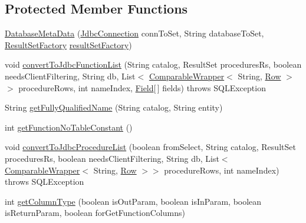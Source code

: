 \subsection*{Protected Member Functions}
\begin{DoxyCompactItemize}
\item 
\mbox{\hyperlink{classcom_1_1mysql_1_1cj_1_1jdbc_1_1_database_meta_data_a42c3cdfdc4a332f7c7bd740e2c069071}{Database\+Meta\+Data}} (\mbox{\hyperlink{interfacecom_1_1mysql_1_1cj_1_1jdbc_1_1_jdbc_connection}{Jdbc\+Connection}} conn\+To\+Set, String database\+To\+Set, \mbox{\hyperlink{classcom_1_1mysql_1_1cj_1_1jdbc_1_1result_1_1_result_set_factory}{Result\+Set\+Factory}} \mbox{\hyperlink{classcom_1_1mysql_1_1cj_1_1jdbc_1_1_database_meta_data_a339d870086c3e13ea14e9a6b3cf1894e}{result\+Set\+Factory}})
\item 
void \mbox{\hyperlink{classcom_1_1mysql_1_1cj_1_1jdbc_1_1_database_meta_data_a23ca9ddec13a2fa4cc61de50318d425a}{convert\+To\+Jdbc\+Function\+List}} (String catalog, Result\+Set procedures\+Rs, boolean needs\+Client\+Filtering, String db, List$<$ \mbox{\hyperlink{classcom_1_1mysql_1_1cj_1_1jdbc_1_1_database_meta_data_1_1_comparable_wrapper}{Comparable\+Wrapper}}$<$ String, \mbox{\hyperlink{interfacecom_1_1mysql_1_1cj_1_1result_1_1_row}{Row}} $>$$>$ procedure\+Rows, int name\+Index, \mbox{\hyperlink{classcom_1_1mysql_1_1cj_1_1result_1_1_field}{Field}}\mbox{[}$\,$\mbox{]} fields)  throws S\+Q\+L\+Exception 
\item 
String \mbox{\hyperlink{classcom_1_1mysql_1_1cj_1_1jdbc_1_1_database_meta_data_a88f763d1ddaabe666f7078dd8cd0d853}{get\+Fully\+Qualified\+Name}} (String catalog, String entity)
\item 
int \mbox{\hyperlink{classcom_1_1mysql_1_1cj_1_1jdbc_1_1_database_meta_data_a2f68f4cef1f669ef4e6b85ae8fc98ede}{get\+Function\+No\+Table\+Constant}} ()
\item 
void \mbox{\hyperlink{classcom_1_1mysql_1_1cj_1_1jdbc_1_1_database_meta_data_abe0f1cab8659812bac94f67040bddc4b}{convert\+To\+Jdbc\+Procedure\+List}} (boolean from\+Select, String catalog, Result\+Set procedures\+Rs, boolean needs\+Client\+Filtering, String db, List$<$ \mbox{\hyperlink{classcom_1_1mysql_1_1cj_1_1jdbc_1_1_database_meta_data_1_1_comparable_wrapper}{Comparable\+Wrapper}}$<$ String, \mbox{\hyperlink{interfacecom_1_1mysql_1_1cj_1_1result_1_1_row}{Row}} $>$$>$ procedure\+Rows, int name\+Index)  throws S\+Q\+L\+Exception 
\item 
int \mbox{\hyperlink{classcom_1_1mysql_1_1cj_1_1jdbc_1_1_database_meta_data_ae9c66750a6c3a4441b531d16f552a535}{get\+Column\+Type}} (boolean is\+Out\+Param, boolean is\+In\+Param, boolean is\+Return\+Param, boolean for\+Get\+Function\+Columns)

\end{DoxyCompactItemize}
